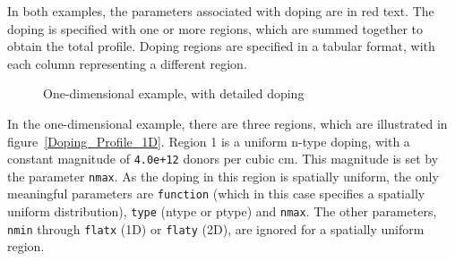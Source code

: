 In both examples, the parameters associated with doping are in red text.  The doping is specified with one or
more regions, which are summed together to obtain the total profile.  Doping regions are specified in a tabular format, with each column
representing a different region.  

\begin{figure}
  \begin{centering}
\caption{One-dimensional example, with detailed doping
\label{One_D_Doping_Electrode_1}}
\end{centering}
\end{figure}

In the one-dimensional example, there are three regions, which are illustrated in
figure~\ref{Doping_Profile_1D}.  Region 1 is a uniform n-type
doping, with a constant magnitude of \texttt{4.0e+12} donors per cubic cm.  This 
magnitude is set by the parameter \texttt{nmax}.  As the
doping in this region is spatially uniform, the only meaningful parameters
are \texttt{function} (which in this case specifies a spatially uniform 
distribution), \texttt{type} (ntype or ptype) and \texttt{nmax}.  
The other parameters, \texttt{nmin} through \texttt{flatx} (1D) or \texttt{flaty} (2D), 
are ignored for a spatially uniform region.

